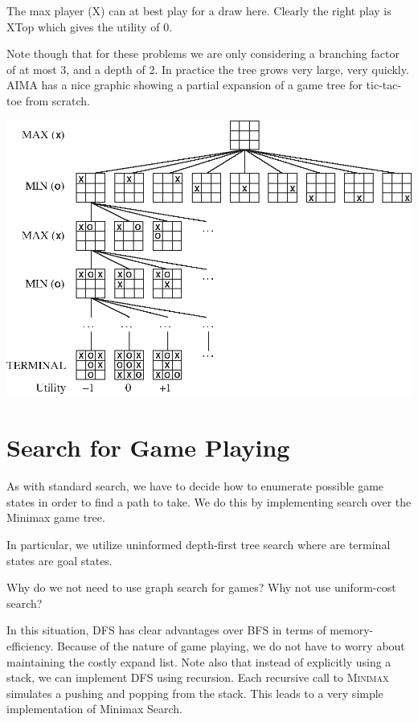 \documentclass[11pt]{article}
\begin{document}
The max player (X) can at best play for a draw here. 
Clearly the right play is XTop which gives the utility of 0. 

Note though that for these problems we are only considering a branching factor of at most 3, and a depth of 2. In practice the tree grows very large, very quickly.
AIMA has a nice graphic showing a partial  expansion of a game tree for tic-tac-toe from scratch. 

\begin{center}
  \includegraphics{pics/tictactoe}
\end{center}

\section{Search for Game Playing}

As with standard search, we have to decide how to 
enumerate possible game states in order to find a path to take. We do this by implementing search over the Minimax game tree. 

In particular, we utilize uninformed depth-first tree search where are terminal states are goal states. 
\begin{exercise}
  Why do we not need to use graph search for games? Why not use uniform-cost search?
\end{exercise}

\censor{}


In this situation, DFS has clear advantages over BFS in terms of memory-efficiency. Because of the nature of game playing, we do not have to worry about maintaining the costly expand list. 
Note also that instead of explicitly using a stack, we can implement DFS using recursion. Each recursive call to \textsc{Minimax} simulates a pushing and popping from the stack. This leads to a very simple implementation of Minimax Search. 
\air
\end{document}
